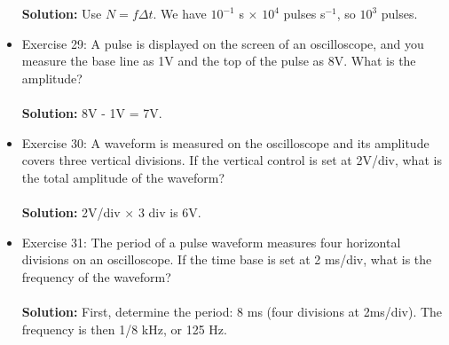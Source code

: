 \documentclass{article}
\begin{document}
\begin{itemize}
    \noindent
    \textbf{Solution:} Use $N = f\Delta t$.  We have $10^{-1}$ s $\times$ $10^4$ pulses s$^{-1}$, so $10^3$ pulses. \\
    \item Exercise 29: A pulse is displayed on the screen of an oscilloscope, and you measure the base line as 1V and the top of the pulse as 8V.  What is the amplitude? \\ \\
    \noindent
    \textbf{Solution:} 8V - 1V = 7V. \\
    \item Exercise 30: A waveform is measured on the oscilloscope and its amplitude covers three vertical divisions.  If the vertical control is set at 2V/div, what is the total amplitude of the waveform? \\ \\
    \noindent
    \textbf{Solution:} 2V/div $\times$ 3 div is 6V. \\
    \item Exercise 31: The period of a pulse waveform measures four horizontal divisions on an oscilloscope.  If the time base is set at 2 ms/div, what is the frequency of the waveform? \\ \\
    \textbf{Solution:} First, determine the period: 8 ms (four divisions at 2ms/div).  The frequency is then 1/8 kHz, or 125 Hz.
\end{itemize}
\end{document}
